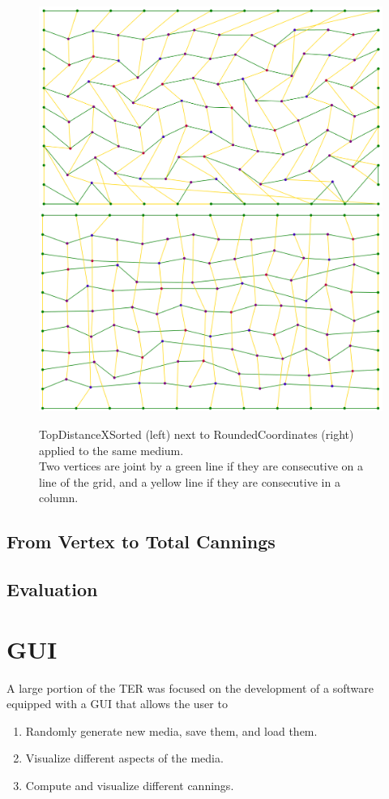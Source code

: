 \documentclass{article}
\begin{document}
\begin{figure}[H]
	\centering\includegraphics[width=0.45\linewidth]{assets/TopDistanceXSorted.png}
	\centering\includegraphics[width=0.45\linewidth]{assets/RoundedCoordinates.png}
	\caption{TopDistanceXSorted (left) next to RoundedCoordinates (right) applied to the same medium.\\
	Two vertices are joint by a green line if they are consecutive on a line of the grid, and a yellow line if they are consecutive in a column.}
	\label{fig:topdist_vs_rounded}
\end{figure}

\subsection{From Vertex to Total Cannings}



\subsection{Evaluation}

\section{GUI}

A large portion of the TER was focused on the development of a software equipped with a GUI that allows the user to
\begin{enumerate}
	\item Randomly generate new media, save them, and load them.
	\item Visualize different aspects of the media.
	\item Compute and visualize different cannings.
\end{enumerate}
$ $
\end{document}
